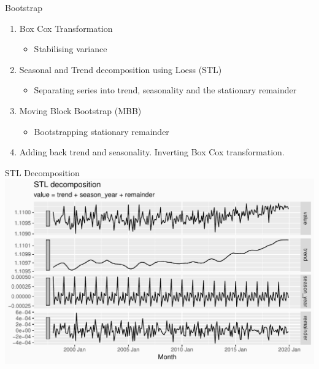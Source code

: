 \documentclass[14pt,ignorenonframetext,]{beamer}
\providecommand{\tightlist}{%
  \setlength{\itemsep}{0pt}\setlength{\parskip}{0pt}}
\begin{document}
\begin{frame}{Bootstrap}
\protect\hypertarget{bootstrap}{}
\begin{block}{\citet{Bergmeir2016-yx}}
\protect\hypertarget{bergmeir2016-yx}{}
\begin{enumerate}
\tightlist
\item
  Box Cox Transformation

  \begin{itemize}
  \tightlist
  \item
    Stabilising variance
  \end{itemize}
\item
  Seasonal and Trend decomposition using Loess (STL)

  \begin{itemize}
  \tightlist
  \item
    Separating series into trend, seasonality and the stationary
    remainder
  \end{itemize}
\item
  Moving Block Bootstrap (MBB)

  \begin{itemize}
  \tightlist
  \item
    Bootstrapping stationary remainder
  \end{itemize}
\item
  Adding back trend and seasonality. Inverting Box Cox transformation.
\end{enumerate}
\end{block}
\end{frame}

\begin{frame}{STL Decomposition}
\protect\hypertarget{stl-decomposition}{}
\includegraphics[width=\linewidth]{plot/p_stl}
\end{frame}
\end{document}
